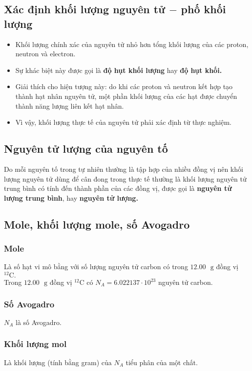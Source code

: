 \subsection{Xác định khối lượng nguyên tử $-$ phố khối lượng}
\begin{itemize}
\item Khối lượng chính xác của nguyên tử nhỏ hơn tổng khối lượng của các proton, neutron và electron.
\item Sự khác biệt này được gọi là \textbf{độ hụt khối lượng} hay \textbf{độ hụt khối.}
\item Giải thích cho hiện tượng này: do khi các proton và neutron kết hợp tạo thành hạt nhân nguyên tử, một phần khối lượng của các hạt được chuyển thành năng lượng liên kết hạt nhân.
\item Vì vậy, khối lượng thực tế của nguyên tử phải xác định từ thực nghiệm.
\end{itemize}
\subsection{Nguyên tử lượng của nguyên tố}
Do mỗi nguyên tố trong tự nhiên thường là tập hợp của nhiều đồng vị nên khối lượng nguyên tử dùng để cân đong trong thực tế thường là khối lượng nguyên tử trung bình có tính đến thành phần của các đồng vị, được gọi là \textbf{nguyên tử lượng trung bình}, hay \textbf{nguyên tử lượng.}
\subsection{Mole, khối lượng mole, số Avogadro}
\subsubsection{Mole}
Là số hạt vi mô bằng với số lượng nguyên tử carbon có trong $12.00 \text{ } \mathrm{g}$ đồng vị $\mathrm{^{12}C}.$\\
Trong $12.00 \text{ } \mathrm{g}$ đồng vị $\mathrm{^{12}C}$ có $N_A = 6.022137 \cdot 10^{23}$ nguyên tử carbon.
\subsubsection{Số Avogadro}
$N_A$ là số Avogadro.
\subsubsection{Khối lượng mol}
Là khối lượng (tính bằng gram) của $N_A$ tiểu phân của một chất.